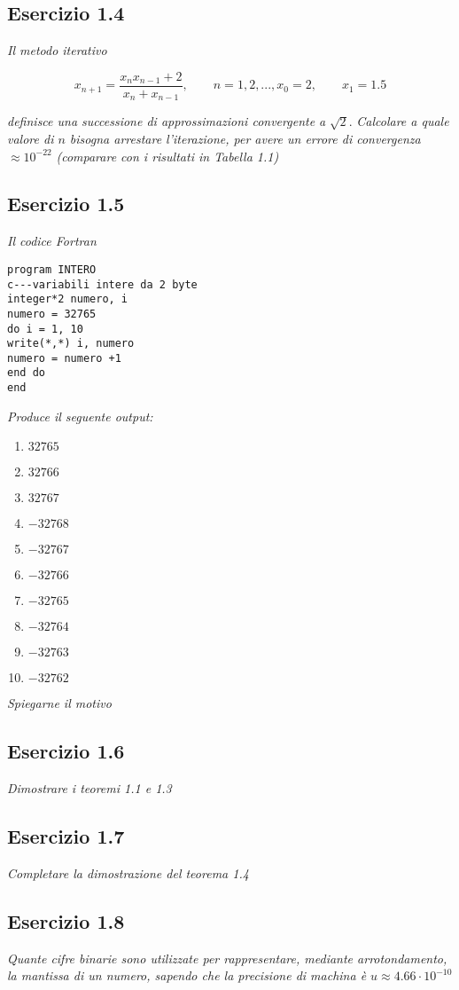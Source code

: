 \subsection{Esercizio 1.4}

\emph{Il metodo iterativo}

$$x_{n+1} = \frac{x_{n}x_{n-1}+2}{x_{n}+x_{n-1}}, \qquad n = 1, 2, ..., x_{0} = 2,\qquad x_{1} = 1.5 $$

\emph{definisce una successione di approssimazioni convergente a} $\sqrt{2}$. \emph{Calcolare a quale valore di $ n $ bisogna arrestare l'iterazione, per avere un errore di convergenza}
$\approx 10^{-22}$ \emph{(comparare con i risultati in Tabella 1.1)}

\subsection{Esercizio 1.5}
\emph{Il codice Fortran}
\lstset{language=[90]Fortran}
\begin{lstlisting}
program INTERO
c---variabili intere da 2 byte
integer*2 numero, i
numero = 32765
do i = 1, 10
write(*,*) i, numero
numero = numero +1
end do
end
\end{lstlisting}
\emph{Produce il seguente output:}
\begin{enumerate}
\item $32765$
\item $32766$
\item $32767$
\item $-32768$
\item $-32767$
\item $-32766$
\item $-32765$
\item $-32764$
\item $-32763$
\item $-32762$
\end{enumerate}
\emph{Spiegarne il motivo}


\subsection{Esercizio 1.6}
\emph{Dimostrare i teoremi 1.1 e 1.3}
\subsection{Esercizio 1.7}
\emph{Completare la dimostrazione del teorema 1.4}

\subsection{Esercizio 1.8}
\emph{Quante cifre binarie sono utilizzate per rappresentare, mediante arrotondamento, la mantissa di un numero, sapendo che la precisione di machina è $ u \approx 4.66 \cdot 10^{-10} $}

